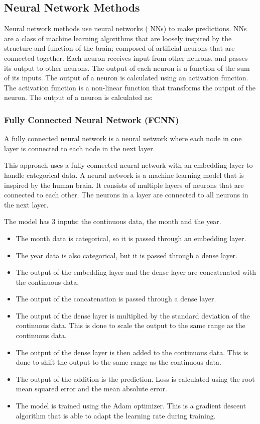 \documentclass[manuscript,screen,nonacm,11pt]{acmart}                                                          %
\numberwithin{equation}{section}
\begin{document}
\subsection{Neural Network Methods}
Neural network methods use neural networks ( NNs) to make predictions. 
NNs are a class of machine learning algorithms that are loosely inspired by the structure and function of the brain; composed of artificial neurons that are connected together. Each neuron receives input from other neurons, and passes its output to other neurons. The output of each neuron is a function of the sum of its inputs. The output of a neuron is calculated using an activation function. The activation function is a non-linear function that transforms the output of the neuron. The output of a neuron is calculated as:


\subsubsection{Fully Connected Neural Network (FCNN)}
A fully connected neural network is a neural network where each node in one
    layer is connected to each node in the next layer.

	This approach uses a fully connected neural network with an embedding layer 
	to handle categorical data.
	A neural network is a machine learning model that is inspired by the human brain.
	It consists of multiple layers of neurons that are connected to each other.
	The neurons in a layer are connected to all neurons in the next layer.
	
	The model has 3 inputs: the continuous data, the month and the year.
	\begin{itemize}
		\item The month data is categorical, so it is passed through an embedding layer.
		\item The year data is also categorical, but it is passed through a dense layer.
		\item The output of the embedding layer and the dense layer are concatenated with the continuous data.
		\item The output of the concatenation is passed through a dense layer.
		\item The output of the dense layer is multiplied by the standard deviation of the continuous data. 
		This is done to scale the output to the same range as the continuous data.
		\item The output of the dense layer is then added to the continuous data. This is done to shift 
		the output to the same range as the continuous data.
		\item The output of the addition is the prediction.
		Loss is calculated using the root mean squared error and the mean absolute error.
		\item The model is trained using the Adam optimizer. This is a gradient descent algorithm that
		is able to adapt the learning rate during training.
	\end{itemize}
\end{document}
